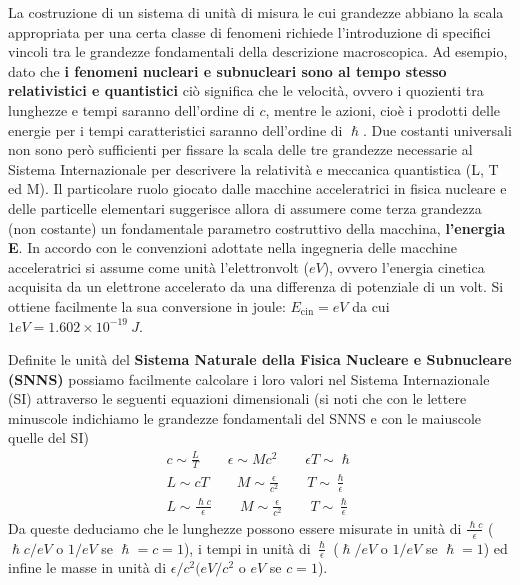 La costruzione di un sistema di unità di misura le cui grandezze abbiano la scala appropriata per una certa classe di
fenomeni richiede l'introduzione di specifici vincoli tra le grandezze fondamentali della descrizione macroscopica.
Ad esempio, dato che \textbf{i fenomeni nucleari e subnucleari sono al tempo stesso relativistici e quantistici} ciò
significa che le velocità, ovvero i quozienti tra lunghezze e tempi saranno dell'ordine di $c$, mentre le azioni, cioè i
prodotti delle energie per i tempi caratteristici saranno dell'ordine di $\hslash$.
Due costanti universali non sono però sufficienti per fissare la scala delle tre grandezze necessarie al Sistema
Internazionale per descrivere la relatività e meccanica quantistica (L, T ed M).
Il particolare ruolo giocato dalle macchine acceleratrici in fisica nucleare e delle particelle elementari suggerisce
allora di assumere come terza grandezza (non costante) un fondamentale parametro costruttivo della macchina, \textbf{l'energia E}.
In accordo con le convenzioni adottate nella ingegneria delle macchine acceleratrici si assume come unità l'elettronvolt
($eV$), ovvero l'energia cinetica acquisita da un elettrone accelerato da una differenza di potenziale di un volt.
Si ottiene facilmente la sua conversione in joule: $E_\text{cin} = eV$ da cui $1 eV = 1.602 \times 10^{-19} \ J$.

Definite le unità del \textbf{Sistema Naturale della Fisica Nucleare e Subnucleare (SNNS)} possiamo facilmente calcolare
i loro valori nel Sistema Internazionale (SI) attraverso le seguenti equazioni dimensionali (si noti che con le lettere
minuscole indichiamo le grandezze fondamentali del SNNS e con le maiuscole quelle del SI)
\begin{gather*}
    c \sim \frac{L}{T} \qquad \epsilon \sim M c^2 \qquad \epsilon T \sim \hslash\\
    L \sim cT \qquad M \sim \frac{\epsilon}{c^2} \qquad T \sim \frac{\hslash}{\epsilon} \\
     L \sim \frac{\hslash c}{\epsilon} \qquad M \sim \frac{\epsilon}{c^2} \qquad T \sim  \frac{\hslash}{\epsilon}
\end{gather*}
Da queste deduciamo che le lunghezze possono essere misurate in unità di $\frac{\hslash c}{\epsilon}$ ($\hslash c / eV$ o $1/eV$ se $\hslash=c=1$),
i tempi in unità di $\frac{\hslash}{\epsilon}$ ($\hslash/eV$ o $1/eV$ se $\hslash=1$) ed infine le masse in unità di $\epsilon/c^2(eV/c^2$ o $eV$ se $c=1$).
\bigskip

